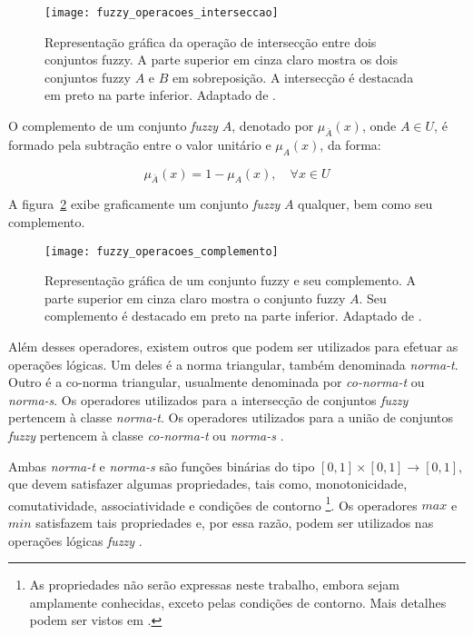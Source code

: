 \begin{figure}[!h]
  \centering
  \texttt{[image: fuzzy\_operacoes\_interseccao]}
  \caption[Operação de intersecção entre dois conjuntos fuzzy]{Representação gráfica da operação de intersecção entre dois conjuntos fuzzy. A parte superior em cinza claro mostra os dois conjuntos fuzzy $A$ e $B$ em sobreposição. A intersecção é destacada em preto na parte inferior. Adaptado de \citet{vrusias:06}.}
  \label{fig:fuzzy_operacoes_interseccao}
\end{figure}

\begin{defn}
\label{def:conjunto_fuzzy_complemento}
O complemento de um conjunto \emph{fuzzy} $A$, denotado por $\mu_{\bar{A}}(x)$, onde $A \in U$, é formado pela subtração entre o valor unitário e $\mu_A(x)$, da forma:

\begin{equation}
  \mu_{\bar{A}}(x) = 1 - \mu_A(x), \quad \forall x \in U
\end{equation}
\end{defn}

A figura~\ref{fig:fuzzy_operacoes_complemento} exibe graficamente um conjunto \emph{fuzzy} $A$ qualquer, bem como seu complemento.

\begin{figure}[!h]
  \centering
  \texttt{[image: fuzzy\_operacoes\_complemento]}
  \caption[Conjunto fuzzy e seu complemento]{Representação gráfica de um conjunto fuzzy e seu complemento. A parte superior em cinza claro mostra o conjunto fuzzy $A$. Seu complemento é destacado em preto na parte inferior. Adaptado de \citet{vrusias:06}.}
  \label{fig:fuzzy_operacoes_complemento}
\end{figure}

Além desses operadores, existem outros que podem ser utilizados para efetuar as operações lógicas. Um deles é a norma triangular, também denominada \emph{norma-t}. Outro é a co-norma triangular, usualmente denominada por \emph{co-norma-t} ou \emph{norma-s}. Os operadores utilizados para a intersecção de conjuntos \emph{fuzzy} pertencem à classe \emph{norma-t}. Os operadores utilizados para a união de conjuntos \emph{fuzzy} pertencem à classe \emph{co-norma-t} ou \emph{norma-s} \citep{zimmermann:01}.

Ambas \emph{norma-t} e \emph{norma-s} são funções binárias do tipo $[0, 1] \times [0, 1] \rightarrow [0, 1]$, que devem satisfazer algumas propriedades, tais como, monotonicidade, comutatividade, associatividade e condições de contorno \footnote{As propriedades não serão expressas neste trabalho, embora sejam amplamente conhecidas, exceto pelas condições de contorno. Mais detalhes podem ser vistos em \citet{zimmermann:01}.}. Os operadores $max$ e $min$ satisfazem tais propriedades e, por essa razão, podem ser utilizados nas operações lógicas \emph{fuzzy} \citep{zimmermann:01}.


